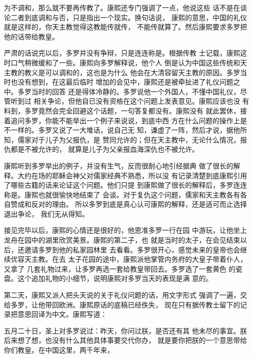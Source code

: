 为不调和，那么就不要再传教了。康熙还专门强调了一点，他说这些%
话不是在谈论二者到底调和与否，只是指出一个现实。换句话说，%
康熙的意思，中国的礼仪就是这样的，你天主教觉得这教能传就传，%
不能传就算了。然后康熙要求多罗把他的话带给教皇。%
\par
严肃的话说完以后，多罗并没有争辩，只是连连称是。根据传教%
士记载，康熙这时口气稍微缓和了一些。康熙向多罗解释说，他个人%
倒是认为中国这些传统和天主教的教义是可以调和的，这也是为什么%
他会在大清容留天主教的原因。多罗当时也没有想到，在这最后临时%
增加的会见中，康熙还是被牵扯进了礼仪问题之中。多罗当时的回答%
还是得体冷静的。多罗说他一个外国人，不懂中国礼仪，尽管听到过%
相关争论，但他自已没有资格在这个问题上发表意见。康熙应该也没%
有料到，多罗竟然会完全回避这个话题，一句答复都没有。康熙没有%
就此罢休，接着追问多罗，你能不能举出一个例子来说说，到底中西%
方在什么问题的操作上是不一样的。多罗又说了一大堆话，说自己无%
知，谦虚了一阵，然后才说，据他所知，儒家对于儿子为父报仇，是%
赞同允许的；但在天主教中，无论什么情况，报仇都是不被允许的，%
就算是儿子为父亲报血海深仇也不被允许。%
\par
康熙听到多罗举出的例子，并没有生气，反而很耐心地引经据典%
做了很长的解释。大约在场的耶稣会神父对儒家经典不熟悉，所以没%
有记录清楚到底康熙引用了哪些古籍的话来论证这个问题。他们只提%
到康熙做了很长的解释后，多罗连连称是。康熙也就很愉快地结束了%
会谈。对于复仇这个问题，儒家和天主教各有各自赞成和反对的理由。%
所以多罗到底是真心认可康熙的解释，还是适可而止选择退出争论，%
我们无从得知。%
\par
接见完毕以后，康熙的心情还是很好的，他恩准多罗一行在园%
中游玩，让他坐上龙舟在园中的湖里欣赏美景。康熙的第二子，也%
就是当时的太子，在会见结束以后，还邀请多罗到他的私家园林里%
去看看。多罗很开心，感觉未来的皇帝也会继续优容天主教。在去%
太子花园的途中，康熙派他掌管内务府的大皇子带着仆人，又拿了%
几套礼物过来，让多罗再选一套给教皇带回去。多罗选了一套黄色%
的瓷盘。这个追加礼物的小细节，说明康熙对多罗当天的表现是满%
意的。%
\par
第二天，康熙又派人把头天说的关于礼仪问题的话，用文字形式%
强调了一遍，交给多罗，让他带回欧洲。康熙原话的底稿已经佚失，%
现在只有据传教士留下的记录把意思回译为中文。康熙写道：%
\par
{\bookkai 五月二十日，圣上对多罗说过：昨天，你问过朕，是否还有其}%
{\bookkai 他未尽的事宜。朕后来想了想，也没有什么其他具体事要交代你办，}%
{\bookkai 就是要你把朕的一个意思带给你们教皇。在中国这里，两千年来，}%
